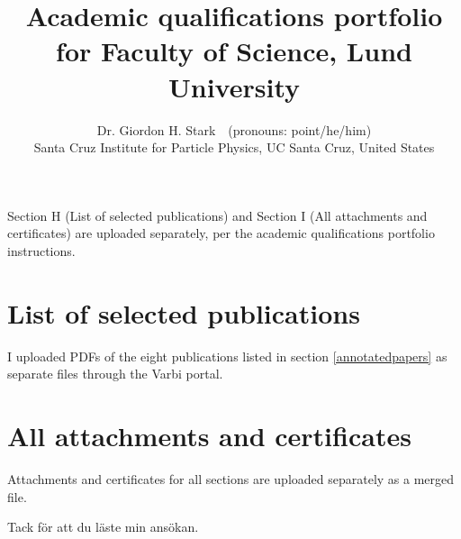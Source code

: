 \documentclass[10pt,a4paper,sans, oneside]{book}
\title{\Huge Academic qualifications portfolio for Faculty of Science, Lund University}
\author{\Large Dr. Giordon H. Stark\ \faIcon{deaf}\ {\small\color{gray}(pronouns: point/he/him)}\\[1em]\faIcon{university} Santa Cruz Institute for Particle Physics, UC Santa Cruz, United States}
\date{}
\begin{document}
\maketitle

\tableofcontents

\vspace{1cm}
\noindent Section H (List of selected publications) and Section I (All attachments and certificates) are uploaded separately, per the academic qualifications portfolio instructions.















\vspace{2cm}

\section{List of selected publications} \label{sec:list-of-selected-publications}
I uploaded PDFs of the eight publications listed in section \ref{annotatedpapers} as separate files through the Varbi portal.

\section{All attachments and certificates} \label{sec:all-attachments-and-certificates}
Attachments and certificates for all sections are uploaded separately as a merged file.

\vspace{0.5cm}
\noindent Tack f\"or att du l\"aste min ans\"okan.
\end{document}

